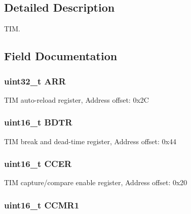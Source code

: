 \subsection{Detailed Description}
T\-I\-M. 

\subsection{Field Documentation}
\hypertarget{struct_t_i_m___type_def_af17f19bb4aeea3cc14fa73dfa7772cb8}{
\subsubsection[{A\-R\-R}]{ uint32\-\_\-t A\-R\-R}}\label{struct_t_i_m___type_def_af17f19bb4aeea3cc14fa73dfa7772cb8}
T\-I\-M auto-\/reload register, Address offset\-: 0x2\-C \hypertarget{struct_t_i_m___type_def_a112c0403ac38905a70cf5aaa9c8cc38a}{
\subsubsection[{B\-D\-T\-R}]{ uint16\-\_\-t B\-D\-T\-R}}\label{struct_t_i_m___type_def_a112c0403ac38905a70cf5aaa9c8cc38a}
T\-I\-M break and dead-\/time register, Address offset\-: 0x44 \hypertarget{struct_t_i_m___type_def_ab1da3e84848ed66e0577c87c199bfb6d}{
\subsubsection[{C\-C\-E\-R}]{ uint16\-\_\-t C\-C\-E\-R}}\label{struct_t_i_m___type_def_ab1da3e84848ed66e0577c87c199bfb6d}
T\-I\-M capture/compare enable register, Address offset\-: 0x20 \hypertarget{struct_t_i_m___type_def_a90d89aec51d8012b8a565ef48333b24b}{
\subsubsection[{C\-C\-M\-R1}]{ uint16\-\_\-t C\-C\-M\-R1}}\label{struct_t_i_m___type_def_a90d89aec51d8012b8a565ef48333b24b}
